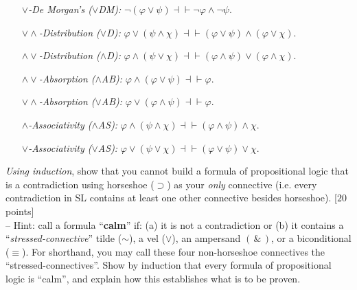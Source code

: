 \documentclass[12pt]{article}
\def\eor{\ensuremath{\vee}}
\def\eand{\ensuremath{\,\&\,}}
\def\eif{\ensuremath{\supset}}
\def\eiff{\ensuremath{\equiv}}
\def\enot{\ensuremath{{\sim}}} %
\let\oldsim\sim %
\renewcommand{\sim}{{\oldsim}} %
\begin{document}
\begin{enumerate}[leftmargin=2.75in]
  \item[\it $\vee$-De Morgan's \textsc{($\vee$DM):}] $\neg(\varphi\vee\psi)\dashv\vdash\neg\varphi\wedge\neg\psi$.
  \item[\it ${\vee}{\wedge}$-Distribution \textsc{($\vee$D):}] $\varphi\vee(\psi\wedge\chi) \dashv\vdash (\varphi\vee\psi)\wedge(\varphi\vee\chi)$.
  \item[\it ${\wedge}{\vee}$-Distribution \textsc{($\wedge$D):}] $\varphi\wedge(\psi\vee\chi) \dashv\vdash (\varphi\wedge\psi)\vee(\varphi\wedge\chi)$.
  \item[\it ${\wedge}{\vee}$-Absorption \textsc{($\wedge$AB):}] $\varphi\wedge(\varphi\vee\psi) \dashv\vdash \varphi$.
  \item[\it ${\vee}{\wedge}$-Absorption \textsc{($\vee$AB):}] $\varphi\vee(\varphi\wedge\psi) \dashv\vdash \varphi$.
  \item[\it $\wedge$-Associativity \textsc{($\wedge$AS):}] $\varphi\wedge(\psi\wedge\chi) \dashv\vdash (\varphi\wedge\psi)\wedge\chi$.
  \item[\it $\vee$-Associativity \textsc{($\vee$AS):}] $\varphi\vee(\psi\vee\chi) \dashv\vdash (\varphi\vee\psi)\vee\chi$.
\end{enumerate}


    








\iffalse



 \textit{Using induction}, show that you cannot build a formula of propositional logic that is a contradiction using horseshoe (\eif) as your \textit{only} connective (i.e. every contradiction in SL contains at least one other connective besides horseshoe). [$20$ points] \\

-- Hint: call a formula ``\textbf{calm}'' if: (a) it is not a contradiction or (b) it
contains a ``\textit{stressed-connective}'' tilde (\enot), a vel (\eor), an ampersand $(\eand)$, or a biconditional (\eiff). For shorthand, you may call these four non-horseshoe connectives the ``stressed-connectives''. Show by induction that every formula of propositional logic is ``calm'', and explain how this establishes what is to be proven. \\
\end{document}
